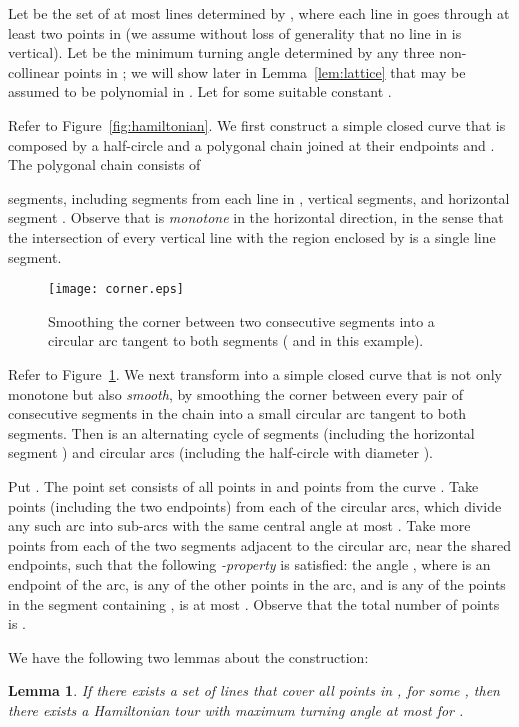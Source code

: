 \documentclass[letterpaper,11pt]{article}
\newtheorem{lemma}{Lemma}
\begin{document}
Let  be the set of at most  lines determined by ,
where each line in  goes through at least two points in 
(we assume without loss of generality that no line in  is vertical).
Let  be the minimum turning angle determined
by any three non-collinear points in ;
we will show later in Lemma~\ref{lem:lattice}
that  may be assumed to be polynomial in .
Let  for some suitable constant .

Refer to Figure~\ref{fig:hamiltonian}.
We first construct a simple closed curve  that is composed by
a half-circle and a polygonal chain
joined at their endpoints  and .
The polygonal chain consists of

segments, including  segments from each line in ,
 vertical segments, and  horizontal segment .
Observe that  is \emph{monotone} in the horizontal direction,
in the sense that the intersection of every vertical line
with the region enclosed by  is a single line segment.

\begin{figure}[htb]
\centering\texttt{[image: corner.eps]}
\caption{Smoothing the corner between two consecutive segments
into a circular arc tangent to both segments
( and  in this example).}
\label{fig:corner}
\end{figure}

Refer to Figure~\ref{fig:corner}.
We next transform  into a simple closed curve 
that is not only monotone but also \emph{smooth},
by smoothing the corner between every pair of consecutive segments
in the chain into a small circular arc tangent to both segments.
Then  is an alternating cycle of  segments
(including the horizontal segment )
and  circular arcs
(including the half-circle with diameter ).

Put .
The point set  consists of all  points in 
and  points from the curve .
Take  points (including the two endpoints)
from each of the  circular arcs,
which divide any such arc into  sub-arcs with the same central angle
at most .
Take  more points from each of the two segments adjacent
to the circular arc, near the shared endpoints, such that
the following \emph{-property} is satisfied:
the angle ,
where  is an endpoint of the arc,
 is any of the other  points in the arc,
and  is any of the  points in the segment containing ,
is at most .
Observe that the total number of points is . 

We have the following two lemmas about the construction:

\begin{lemma}\label{lem:hamiltonian-direct}
If there exists a set of  lines that cover all points in ,
for some ,
then there exists a Hamiltonian tour with maximum turning angle at most
 for .
\end{lemma}
\end{document}

